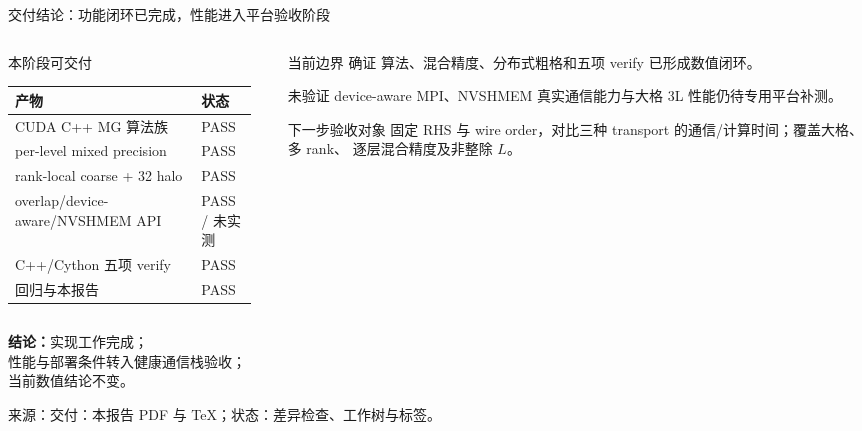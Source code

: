 \documentclass[UTF8,aspectratio=169,11pt]{ctexbeamer}
\newcommand{\source}[1]{%
  \vspace{0.06em}\par{\raggedright\scriptsize\color{muted}来源：#1\par}}
\newcommand{\verified}{\textcolor{evidence}{确证}}
\newcommand{\unverified}{\textcolor{warning}{未验证}}
\newcommand{\passmark}{\textcolor{evidence}{PASS}}
\begin{document}
\begin{frame}[t]{交付结论：功能闭环已完成，性能进入平台验收阶段}
  \begin{columns}[T,totalwidth=\textwidth]
    \begin{column}{0.47\textwidth}
      \begin{block}{本阶段可交付}
        \small
        \begin{tabular}{@{}P{0.72\linewidth}P{0.22\linewidth}@{}}
          \toprule
          产物 & 状态 \\
          \midrule
          CUDA C++ MG 算法族 & \passmark{} \\
          per-level mixed precision & \passmark{} \\
          rank-local coarse + 32 halo & \passmark{} \\
          overlap/device-aware/NVSHMEM API & \passmark{} / 未实测 \\
          C++/Cython 五项 verify & \passmark{} \\
          回归与本报告 & \passmark{} \\
          \bottomrule
        \end{tabular}
      \end{block}
    \end{column}
    \begin{column}{0.49\textwidth}
      \begin{block}{当前边界}
        \small
        \verified{} 算法、混合精度、分布式粗格和五项 verify 已形成数值闭环。
        \par\vspace{0.2em}
        \unverified{} device-aware MPI、NVSHMEM 真实通信能力与大格 3L 性能仍待专用平台补测。
      \end{block}
      \begin{block}{下一步验收对象}
        \small
        固定 RHS 与 wire order，对比三种 transport 的通信/计算时间；覆盖大格、多 rank、
        逐层混合精度及非整除 $L$。
      \end{block}
    \end{column}
  \end{columns}
  \vspace{-0.12em}
  \begin{center}
    \footnotesize
    \textbf{结论：}实现工作完成；\\[-0.1em]
    性能与部署条件转入健康通信栈验收；\\[-0.1em]
    当前数值结论不变。
  \end{center}
  \source{交付：本报告 PDF 与 TeX；状态：差异检查、工作树与标签。}
\end{frame}
\end{document}
